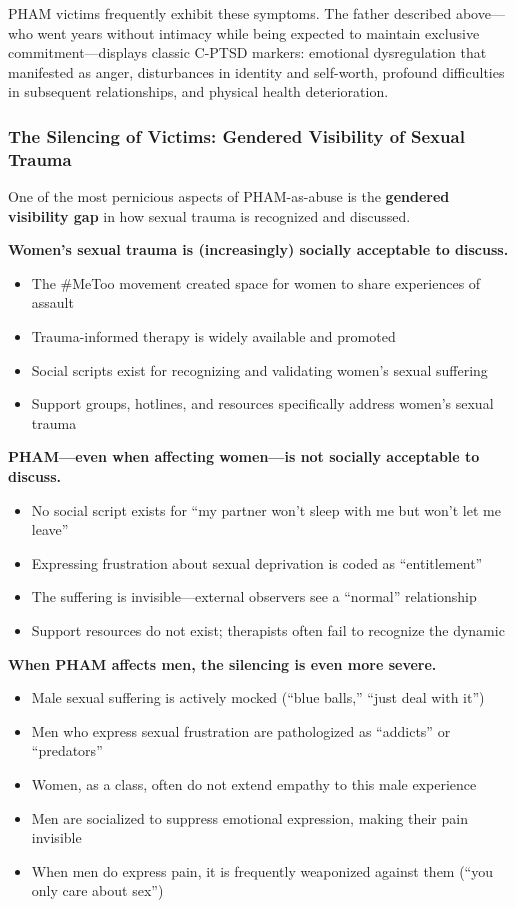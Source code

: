 \documentclass[12pt, letterpaper]{article}
\begin{document}
PHAM victims frequently exhibit these symptoms. The father described above---who went years without intimacy while being expected to maintain exclusive commitment---displays classic C-PTSD markers: emotional dysregulation that manifested as anger, disturbances in identity and self-worth, profound difficulties in subsequent relationships, and physical health deterioration.

\subsubsection{The Silencing of Victims: Gendered Visibility of Sexual Trauma}

One of the most pernicious aspects of PHAM-as-abuse is the \textbf{gendered visibility gap} in how sexual trauma is recognized and discussed.

\textbf{Women's sexual trauma is (increasingly) socially acceptable to discuss.}

\begin{itemize}
    \item The \#MeToo movement created space for women to share experiences of assault
    \item Trauma-informed therapy is widely available and promoted
    \item Social scripts exist for recognizing and validating women's sexual suffering
    \item Support groups, hotlines, and resources specifically address women's sexual trauma
\end{itemize}

\textbf{PHAM---even when affecting women---is not socially acceptable to discuss.}

\begin{itemize}
    \item No social script exists for ``my partner won't sleep with me but won't let me leave''
    \item Expressing frustration about sexual deprivation is coded as ``entitlement''
    \item The suffering is invisible---external observers see a ``normal'' relationship
    \item Support resources do not exist; therapists often fail to recognize the dynamic
\end{itemize}

\textbf{When PHAM affects men, the silencing is even more severe.}

\begin{itemize}
    \item Male sexual suffering is actively mocked (``blue balls,'' ``just deal with it'')
    \item Men who express sexual frustration are pathologized as ``addicts'' or ``predators''
    \item Women, as a class, often do not extend empathy to this male experience
    \item Men are socialized to suppress emotional expression, making their pain invisible
    \item When men do express pain, it is frequently weaponized against them (``you only care about sex'')
\end{itemize}
\end{document}
